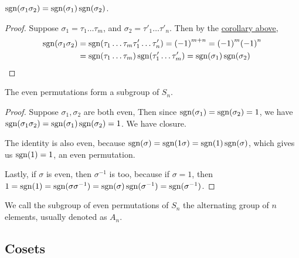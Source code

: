 \begin{theorem}\label{thm:sgn-mult}
    \(\operatorname{sgn}(\sigma_1\sigma_2) = \operatorname{sgn}(\sigma_1)\operatorname{sgn}(\sigma_2)\).
\end{theorem}
\begin{proof}
    Suppose \(\sigma_1 = \tau_1\hdots\tau_m\),
    and \(\sigma_2 = \tau'_1\hdots\tau'_n\).
    Then by the \hyperref[cor:sgn-transposition]{corollary above},
    \begin{align*}
        \operatorname{sgn}(\sigma_1\sigma_2)
        &= \operatorname{sgn}(\tau_1\hdots\tau_m\tau'_1\hdots\tau'_n)
        = {(-1)}^{m+n}
        = {(-1)}^m{(-1)}^n \\
        &= \operatorname{sgn}(\tau_1\hdots\tau_m)\operatorname{sgn}(\tau'_1\hdots\tau'_m)
        = \operatorname{sgn}(\sigma_1)\operatorname{sgn}(\sigma_2)
    \end{align*}
\end{proof}
\begin{corollary}
    The even permutations form a subgroup of \(S_n\).
\end{corollary}
\begin{proof}
    Suppose \(\sigma_1,\sigma_2\) are both even,
    Then since \(\operatorname{sgn}(\sigma_1) = \operatorname{sgn}(\sigma_2) = 1\),
    we have \(\operatorname{sgn}(\sigma_1\sigma_2) = \operatorname{sgn}(\sigma_1)\operatorname{sgn}(\sigma_2) = 1\).
    We have closure.

    The identity is also even,
    because \(\operatorname{sgn}(\sigma) = \operatorname{sgn}(1\sigma) = \operatorname{sgn}(1)\operatorname{sgn}(\sigma)\),
    which gives us \(\operatorname{sgn}(1) = 1\), an even permutation.

    Lastly, if \(\sigma\) is even,
    then \(\sigma^{-1}\) is too,
    because if \(\sigma = 1\),
    then \(1 = \operatorname{sgn}(1) = \operatorname{sgn}(\sigma\sigma^{-1})
    = \operatorname{sgn}(\sigma)\operatorname{sgn}(\sigma^{-1}) = \operatorname{sgn}(\sigma^{-1})\).
\end{proof}
\begin{definition}
    We call the subgroup of even permutations of \(S_n\)
    the alternating group of \(n\) elements,
    usually denoted as \(A_n\).
\end{definition}


\subsection{Cosets}\label{sec:cosets}

